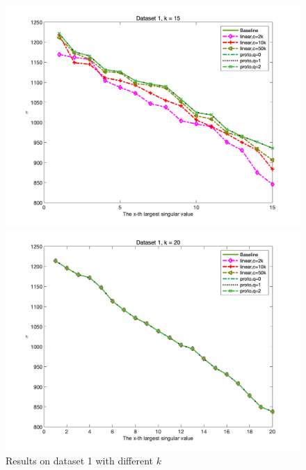 \documentclass{article}
\begin{document}
    \begin{figure}[p]
    \begin{minipage}{0.54\linewidth}
		\centering
		\includegraphics[width=1\linewidth]{./fig/dataset1_15.png}
		\caption{$k=15$}
	\end{minipage}
	\begin{minipage}{0.54\linewidth}
		\centering
		\includegraphics[width=1\linewidth]{./fig/dataset1_20.png}
		\caption{$k=20$}
	\end{minipage}
	\caption*{Results on dataset 1 with different $k$}
\end{figure}



  
\end{document}
